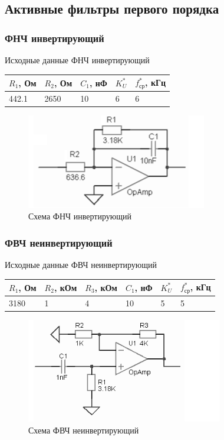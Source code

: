 \documentclass[a4paper, 12pt]{article}
\begin{document}
    \subsection{Активные фильтры первого порядка}
    \subsubsection{ФНЧ инвертирующий}
    Исходные данные ФНЧ инвертирующий
    \begin{center}
        \begin{tabular}{ | m{3.5em} | m{3.5em}| m{3.5em} | m{2.5em} | m{3.5em} |} 
        \hline
        $R_1$, Ом& $R_2$, Ом &$C_1$, нФ &$K_U^*$ &$f_\text{ср}^*$, кГц\\ 
        \hline
        442.1& 2650 & 10 &6 &6\\ 
        \hline
        \end{tabular}
    \end{center}
    \begin{figure}[H]
        \centering
        \includegraphics{low_pass_m.png}
        \captionsetup{skip=0pt}
        \caption{Схема ФНЧ инвертирующий}
        \label{fig:null_scheme1}
    \end{figure}


    \subsubsection{ФВЧ неинвертирующий}
    Исходные данные ФВЧ неинвертирующий
    \begin{center}
        \begin{tabular}{ | m{3.5em} | m{4em}| m{4em} | m{3.5em} | m{2.5em} | m{3.5em} |} 
        \hline
        $R_1$, Ом& $R_2$, кОм &$R_3$, кОм &$C_1$, нФ &$K_U^*$ &$f_\text{ср}^*$, кГц\\ 
        \hline
        3180& 1 &4 &10 &5 &5\\ 
        \hline
        \end{tabular}
    \end{center}
    \begin{figure}[H]
        \centering
        \includegraphics{high_pass_p.png}
        \captionsetup{skip=0pt}
        \caption{Схема ФВЧ неинвертирующий}
        \label{fig:null_scheme2}
    \end{figure}
\end{document}
